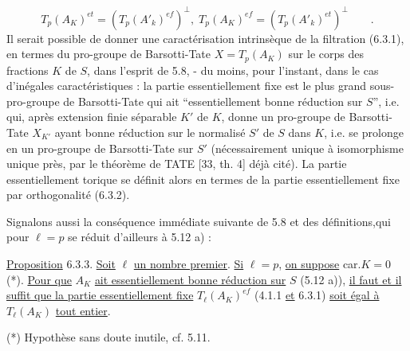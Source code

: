 \begin{equation}\tag{6.3.2}
T_p(A_K)^{et} = (T_p(A'_k)^{ef})^{\perp}, \; T_p(A_K)^{ef} = (T_p(A'_k)^{et})^{\perp} \qquad .
\end{equation}
Il serait possible de donner une caractérisation intrinsèque de la filtration (6.3.1), en termes du pro-groupe de Barsotti-Tate $X = T_p(A_K)$ sur le corps des fractions $K$ de $S$, dans l'esprit de 5.8, - du moins, pour l'instant, dans le cas d'inégales caractéristiques : la partie essentiellement fixe est le plus grand sous-pro-groupe de Barsotti-Tate qui ait ``essentiellement bonne réduction sur $S$'', i.e. qui, après extension finie séparable $K'$ de $K$, donne un pro-groupe de Barsotti-Tate $X_{K'}$ ayant bonne réduction sur le normalisé $S'$ de $S$ dans $K$, i.e. se prolonge en un pro-groupe de Barsotti-Tate sur $S'$ (nécessairement unique à isomorphisme unique près, par le théorème de TATE [33, th. 4] déjà cité). La partie essentiellement torique se définit alors en termes de la partie essentiellement fixe par orthogonalité (6.3.2).

Signalons aussi la conséquence immédiate suivante de 5.8 et des définitions,qui pour $\ell = p$ se réduit d'ailleurs à 5.12 a) :

\underline{Proposition} 6.3.3. \underline{Soit} $\ell$ \underline{un nombre premier}. \underline{Si} $\ell = p$, \underline{on suppose} car.$K = 0$ (*). \underline{Pour que} $A_K$ \underline{ait essentiellement bonne réduction sur} $S$ (5.12 a)), \underline{il faut et il suffit que la partie essentiellement fixe} $T_\ell(A_K)^{ef}$ (4.1.1 \underline{et} 6.3.1) \underline{soit égal à} $T_\ell(A_K)$ \underline{tout entier}.

(*) Hypothèse sans doute inutile, cf. 5.11.



